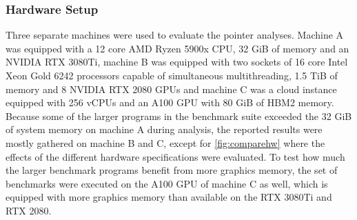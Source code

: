 \subsubsection{Hardware Setup}
Three separate machines were used to evaluate the pointer analyses.
Machine A was equipped with a 12 core AMD Ryzen 5900x CPU, 32 GiB of memory and an NVIDIA RTX 3080Ti, machine B was equipped with two sockets of 16 core Intel Xeon Gold 6242 processors capable of simultaneous multithreading, 1.5 TiB of memory and 8 NVIDIA RTX 2080 GPUs and machine C was a cloud instance equipped with 256 vCPUs and an A100 GPU with 80 GiB of HBM2 memory.
Because some of the larger programs in the benchmark suite exceeded the 32 GiB of system memory on machine A during analysis, the reported results were mostly gathered on machine B and C, except for \autoref{fig:comparehw} where the effects of the different hardware specifications were evaluated.
To test how much the larger benchmark programs benefit from more graphics memory, the set of benchmarks were executed on the A100 GPU of machine C as well, which is equipped with more graphics memory than available on the RTX 3080Ti and RTX 2080.

